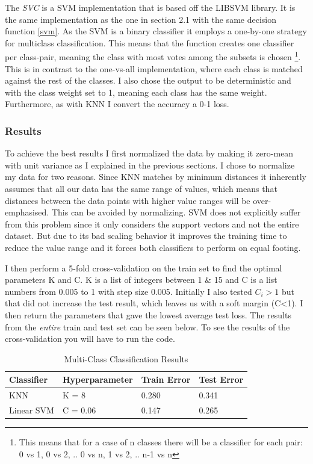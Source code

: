 \documentclass{article}
\theoremstyle{plain}
\theoremstyle{nonumberplain}
\begin{document}
The \textit{SVC}\cite{website:svm-sklearn} is a SVM implementation that is based off the LIBSVM \cite{website:libsvm} library. 
It is the same implementation as the one in section 2.1 with the same decision function \eqref{svm}. 
As the SVM is a binary classifier it employs a one-by-one strategy for multiclass classification. This means that the function creates one classifier per class-pair, meaning the class with most votes among the subsets is chosen
\footnote[1]{This means that for a case of n classes there will be a classifier for each pair: 0 vs 1, 0 vs 2, .. 0 vs n, 1 vs 2, .. n-1 vs n}.
This is in contrast to the one-vs-all implementation, where each class is matched against the rest of the classes. I also chose the output to be deterministic and with the class weight set to 1, meaning each class has the same weight. Furthermore, as with KNN I convert the accuracy a 0-1 loss.

\subsubsection{Results}
To achieve the best results I first normalized the data by making it zero-mean with unit variance as I explained in the previous sections.
I chose to normalize my data for two reasons. 
Since KNN matches by minimum distances it inherently assumes that all our data has the same range of values, which means that distances between the data points with higher value ranges will be over-emphasised. This can be avoided by normalizing. 
SVM does not explicitly suffer from this problem since it only considers the support vectors and not the entire dataset. 
But due to its bad scaling behavior it improves the training time to reduce the value range and it forces both classifiers to perform on equal footing.

I then perform a 5-fold cross-validation on the train set to find the optimal parameters K and C.
K is a list of integers between 1 \& 15 and C is a list numbers from 0.005 to 1 with step size 0.005. 
Initially I also tested $C_i > 1$ but that did not increase the test result, which leaves us with a soft margin (C<1).
I then return the parameters that gave the lowest average test loss.
The results from the \textit{entire} train and test set can be seen below. 
To see the results of the cross-validation you will have to run the code.

\begin{table}[h!]
\centering
\caption{Multi-Class Classification Results}
\label{table:multiclass}
\begin{tabular}{ l | l  l  l }
	\hline \hline
  Classifier & Hyperparameter & Train Error & Test Error \\ [0.5ex]
  	\hline
  KNN & K = 8 & 0.280 & 0.341 \\
  Linear SVM & C = 0.06 & 0.147 & 0.265 \\
  \hline
\end{tabular}
\end{table}
\end{document}
